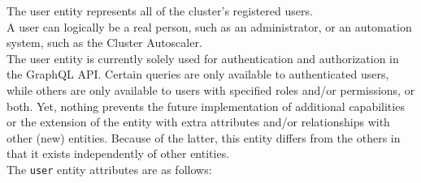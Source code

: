 The user entity represents all of the cluster's registered users. \\ %
A user can logically be a real person, such as an administrator, or an
automation system, such as the Cluster Autoscaler. \\ %
The user entity is currently solely used for authentication and authorization in
the GraphQL API. Certain queries are only available to authenticated users, while
others are only available to users with specified roles and/or permissions, or
both. Yet, nothing prevents the future implementation of additional capabilities
or the extension of the entity with extra attributes and/or relationships with
other (new) entities. Because of the latter, this entity differs from the others
in that it exists independently of other entities. \\ %
The \texttt{user} entity attributes are as follows:
